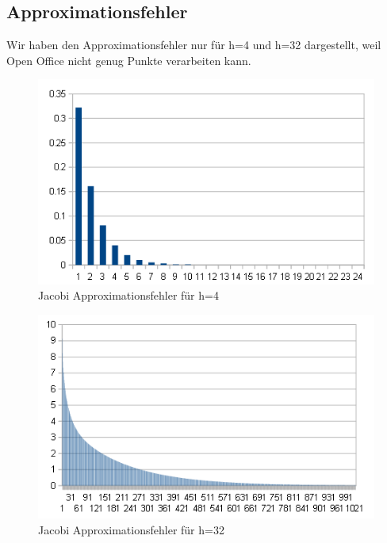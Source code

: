 \documentclass{article}
\begin{document}
\subsection{Approximationsfehler}
Wir haben den Approximationsfehler nur für h=4 und h=32 dargestellt, weil Open Office nicht genug Punkte verarbeiten kann.
\begin{figure}[htbp] 
  \centering
     \includegraphics[width=1\textwidth]{bilder/dj4.png}
  \caption{Jacobi Approximationsfehler für h=4}
  \label{fig:Bild2}
\end{figure}
\begin{figure}[htbp] 
  \centering
     \includegraphics[width=1\textwidth]{bilder/dj32.png}
  \caption{Jacobi Approximationsfehler für h=32}
  \label{fig:Bild3}
\end{figure}
\end{document}
